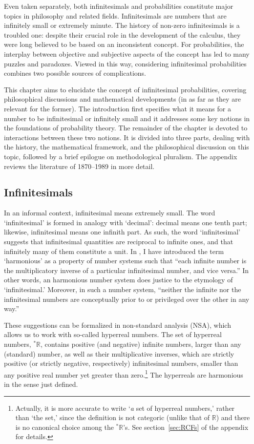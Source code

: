 Even taken separately, both infinitesimals and probabilities constitute major topics in philosophy and related fields.
Infinitesimals are numbers that are infinitely small or extremely minute. The history of non-zero infinitesimals is a troubled one: despite their crucial role in the development of the calculus, they were long believed to be based on an inconsistent concept.
For probabilities, the interplay between objective and subjective aspects of the concept has led to many puzzles and paradoxes.
Viewed in this way, considering infinitesimal probabilities combines two possible sources of complications.

This chapter aims to elucidate the concept of infinitesimal probabilities, covering philosophical discussions and mathematical developments (in as far as they are relevant for the former).
The introduction first specifies what it means for a number to be infinitesimal or infinitely small and it addresses some key notions in the foundations of probability theory.
The remainder of the chapter is devoted to interactions between these two notions. It is divided into three parts, dealing with the history, the mathematical framework, and the philosophical discussion on this topic, followed by a brief epilogue on methodological pluralism. The appendix reviews the literature of 1870--1989 in more detail.

\subsection*{Infinitesimals}\label{sec:infinitesimals}
In an informal context, infinitesimal means extremely small.
The word `infinitesimal' is formed in analogy with `decimal': decimal means one tenth part; likewise, infinitesimal means one infinith part. As such, the word `infinitesimal' suggests that infinitesimal quantities are reciprocal to infinite ones, and that infinitely many of them constitute a unit.
In \citet{Wenmackers:forthc}, I have introduced the term `harmonious' as a property of number systems such that ``each infinite number is the multiplicatory inverse of a particular infinitesimal number, and vice versa.'' In other words, an harmonious number system does justice to the etymology of `infinitesimal.' Moreover, in such a number system, ``neither the infinite nor the infinitesimal numbers are conceptually prior to or privileged over the other in any way.''

These suggestions can be formalized in non-standard analysis (NSA), which allows us to work with so-called hyperreal numbers. The set of hyperreal numbers, ${^*} \mathbb{R}$, contains positive (and negative) infinite numbers, larger than any (standard) number, as well as their multiplicative inverses, which are strictly positive (or strictly negative, respectively) infinitesimal numbers, smaller than any positive real number yet greater than zero.\footnote{Actually, it is more accurate to write `\emph{a} set of hyperreal numbers,' rather than `the set,' since the definition is not categoric (unlike that of $\mathbb{R}$) and there is no canonical choice among the ${^*} \mathbb{R}$'s. See section~\ref{sec:RCFs} of the appendix for details.\label{fn:a-not-the}} The hyperreals are harmonious in the sense just defined.

